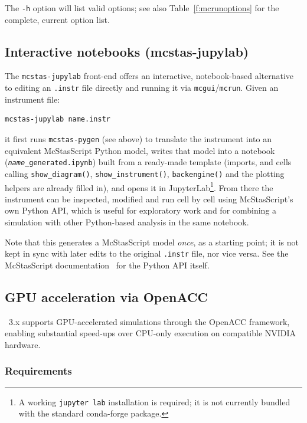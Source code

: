 The \verb+-h+ option will list valid options; see also Table~\ref{f:mcrunoptions}
for the complete, current option list.

\subsection{Interactive notebooks (mcstas-jupylab)}
\label{s:jupylab}

The \texttt{mcstas-jupylab} front-end offers an interactive,
notebook-based alternative to editing an \texttt{.instr} file directly
and running it via \texttt{mcgui}/\texttt{mcrun}. Given an instrument
file:
\begin{lstlisting}
mcstas-jupylab name.instr
\end{lstlisting}
it first runs \texttt{mcstas-pygen} (see above) to translate the
instrument into an equivalent McStasScript Python model, writes that
model into a notebook (\texttt{\textit{name}\_generated.ipynb}) built
from a ready-made template (imports, and cells calling
\texttt{show\_diagram()}, \texttt{show\_instrument()}, \texttt{backengine()}
and the plotting helpers are already filled in), and opens it in
JupyterLab\footnote{A working
\texttt{jupyter lab} installation is required; it is not currently
bundled with the standard conda-forge \MCS package.}. From there the
instrument can be inspected, modified and run cell by cell using
McStasScript's own Python API, which is useful for exploratory work and
for combining a simulation with other Python-based analysis in the same
notebook.

Note that this generates a McStasScript model \emph{once}, as a
starting point; it is not kept in sync with later edits to the original
\texttt{.instr} file, nor vice versa. See the McStasScript
documentation~\cite{mcstasscript} for the Python API itself.

\subsection{GPU acceleration via OpenACC}
\label{s:gpu}

\MCS~3.x supports GPU-accelerated simulations through the OpenACC
framework, enabling substantial speed-ups over CPU-only execution on
compatible NVIDIA hardware.

\subsubsection{Requirements}

